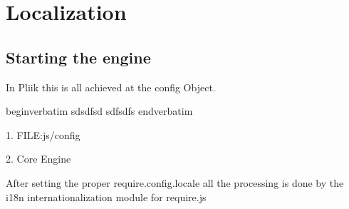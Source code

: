 
\section{Localization}


\subsection{Starting the engine}

In Pliik this is all achieved at the config Object.

begin{verbatim}
sdsdfsd
sdfsdfs
end{verbatim}

1. FILE:js/config

2. Core Engine

After setting the proper require.config.locale all the
processing is done by the i18n internationalization module for require.js

